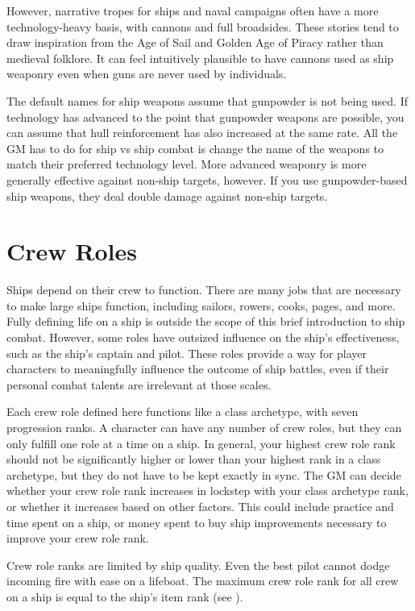     However, narrative tropes for ships and naval campaigns often have a more technology-heavy basis, with cannons and full broadsides.
    These stories tend to draw inspiration from the Age of Sail and Golden Age of Piracy rather than medieval folklore.
    It can feel intuitively plausible to have cannons used as ship weaponry even when guns are never used by individuals.

    The default names for ship weapons assume that gunpowder is not being used.
    If technology has advanced to the point that gunpowder weapons are possible, you can assume that hull reinforcement has also increased at the same rate.
    All the GM has to do for ship vs ship combat is change the name of the weapons to match their preferred technology level.
    More advanced weaponry is more generally effective against non-ship targets, however.
    If you use gunpowder-based ship weapons, they deal double damage against non-ship targets.

\section{Crew Roles}
    Ships depend on their crew to function.
    There are many jobs that are necessary to make large ships function, including sailors, rowers, cooks, pages, and more.
    Fully defining life on a ship is outside the scope of this brief introduction to ship combat.
    However, some roles have outsized influence on the ship's effectiveness, such as the ship's captain and pilot.
    These roles provide a way for player characters to meaningfully influence the outcome of ship battles, even if their personal combat talents are irrelevant at those scales.

    Each crew role defined here functions like a class archetype, with seven progression ranks.
    A character can have any number of crew roles, but they can only fulfill one role at a time on a ship.
    In general, your highest crew role rank should not be significantly higher or lower than your highest rank in a class archetype, but they do not have to be kept exactly in sync.
    The GM can decide whether your crew role rank increases in lockstep with your class archetype rank, or whether it increases based on other factors.
    This could include practice and time spent on a ship, or money spent to buy ship improvements necessary to improve your crew role rank.

    Crew role ranks are limited by ship quality.
    Even the best pilot cannot dodge incoming fire with ease on a lifeboat.
    The maximum crew role rank for all crew on a ship is equal to the ship's item rank (see ).

